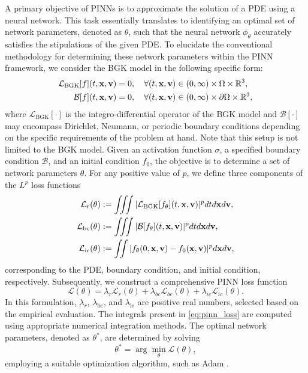 \documentclass[preprint,12pt]{elsarticle}
\begin{document}
A primary objective of PINNs is to approximate the solution of a PDE using a neural network.
This task essentially translates to identifying an optimal set of network parameters, denoted as $\theta$, such that the neural network $\phi_\theta$ accurately satisfies the stipulations of the given PDE.
To elucidate the conventional methodology for determining these network parameters within the PINN framework, we consider the BGK model in the following specific form: 
\begin{align}
    \mathcal{L}_\mathrm{BGK}[f](t,{\bf x,v}) &= 0, \quad \forall (t,{\bf x,v}) \in (0,\infty)\times \Omega \times \mathbb{R}^3, \label{eq:bgk1} \\
    \mathcal{B}[f](t,{\bf x,v}) &= 0, \quad \forall (t, {\bf x, v}) \in (0, \infty) \times \partial \Omega \times \mathbb{R}^3, \label{eq:bgk_bc}
\end{align}
where $\mathcal{L}_\mathrm{BGK}[\cdot]$ is the integro-differential operator of the BGK model and $\mathcal{B}[\cdot]$ may encompass Dirichlet, Neumann, or periodic boundary conditions depending on the specific requirements of the problem at hand.
Note that this setup is not limited to the BGK model.
Given an activation function $\sigma$, a specified boundary condition $\mathcal{B}$, and an initial condition $f_0$, the objective is to determine a set of network parameters $\theta$. 
For any positive value of $p$, we define three components of the $L^p$ loss functions 
\begin{equation}\label{eq:Lp}
\begin{split}
    \mathcal{L}_r(\theta) &:= \iiint |\mathcal{L}_\mathrm{BGK}[f_\theta](t,{\bf x, v})|^p dtd{\bf x}d{\bf v}, \\
    \mathcal{L}_\mathrm{bc}(\theta) &:= \iiint |\mathcal{B}[f_\theta](t,{\bf x, v})|^p dtd{\bf x}d{\bf v}, \\
    \mathcal{L}_\mathrm{ic}(\theta) &:= \iint |f_\theta(0, {\bf x, v}) - f_0({\bf x,v})|^p d{\bf x}d{\bf v},
\end{split}    
\end{equation}
corresponding to the PDE, boundary condition, and initial condition, respectively. Subsequently, we construct a comprehensive PINN loss function
\begin{equation}\label{eq:pinn_loss}
    \mathcal{L}(\theta) = 
    \lambda_r \mathcal{L}_{r}(\theta)
    + \lambda_{bc}\mathcal{L}_{bc}(\theta)
    + \lambda_{ic} \mathcal{L}_{ic}(\theta).
\end{equation}
In this formulation, $\lambda_r$, $\lambda_\mathrm{bc}$, and $\lambda_\mathrm{ic}$ are positive real numbers, selected based on the empirical evaluation.
The integrals present in \eqref{eq:pinn_loss} are computed using appropriate numerical integration methods.
The optimal network parameters, denoted as $\theta^*$, are determined by solving
\[
    \theta^* = \arg \min_\theta \mathcal{L}(\theta),
\]
employing a suitable optimization algorithm, such as Adam \cite{kingma2014adam}.
\end{document}
